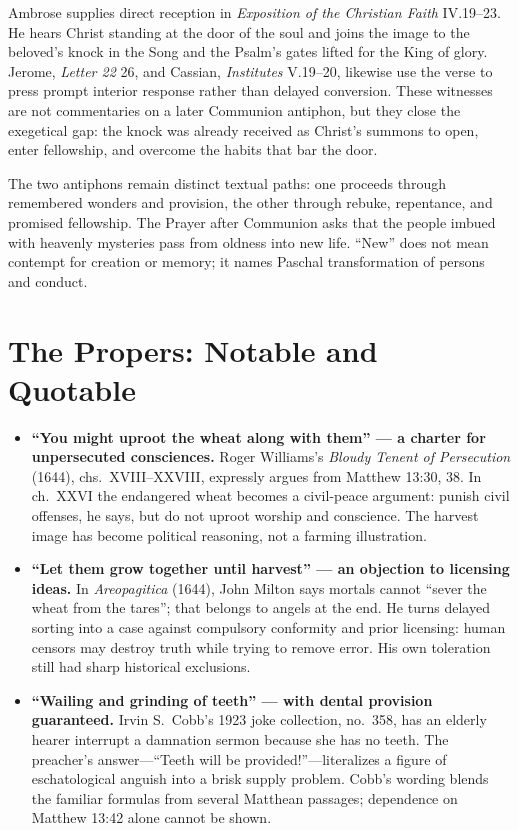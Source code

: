 \begin{deepstudy}
Ambrose supplies direct reception in \emph{Exposition of the Christian Faith} IV.19--23. He hears Christ standing at the door of the soul and joins the image to the beloved's knock in the Song and the Psalm's gates lifted for the King of glory. Jerome, \emph{Letter 22} 26, and Cassian, \emph{Institutes} V.19--20, likewise use the verse to press prompt interior response rather than delayed conversion. These witnesses are not commentaries on a later Communion antiphon, but they close the exegetical gap: the knock was already received as Christ's summons to open, enter fellowship, and overcome the habits that bar the door.

The two antiphons remain distinct textual paths: one proceeds through remembered wonders and provision, the other through rebuke, repentance, and promised fellowship. The Prayer after Communion asks that the people imbued with heavenly mysteries pass from oldness into new life. “New” does not mean contempt for creation or memory; it names Paschal transformation of persons and conduct.

\section*{The Propers: Notable and Quotable}

{\small
\begin{itemize}
\item \textbf{“You might uproot the wheat along with them” --- a charter for unpersecuted consciences.\enspace{}} Roger Williams's \emph{Bloudy Tenent of Persecution} (1644), chs.~XVIII--XXVIII, expressly argues from Matthew 13:30, 38. In ch.~XXVI the endangered wheat becomes a civil-peace argument: punish civil offenses, he says, but do not uproot worship and conscience. The harvest image has become political reasoning, not a farming illustration.

\item \textbf{“Let them grow together until harvest” --- an objection to licensing ideas.\enspace{}} In \emph{Areopagitica} (1644), John Milton says mortals cannot “sever the wheat from the tares”; that belongs to angels at the end. He turns delayed sorting into a case against compulsory conformity and prior licensing: human censors may destroy truth while trying to remove error. His own toleration still had sharp historical exclusions.

\item \textbf{“Wailing and grinding of teeth” --- with dental provision guaranteed.\enspace{}} Irvin S.~Cobb's 1923 joke collection, no.~358, has an elderly hearer interrupt a damnation sermon because she has no teeth. The preacher's answer---“Teeth will be provided!”---literalizes a figure of eschatological anguish into a brisk supply problem. Cobb's wording blends the familiar formulas from several Matthean passages; dependence on Matthew 13:42 alone cannot be shown.


\end{itemize}}
\end{deepstudy}
